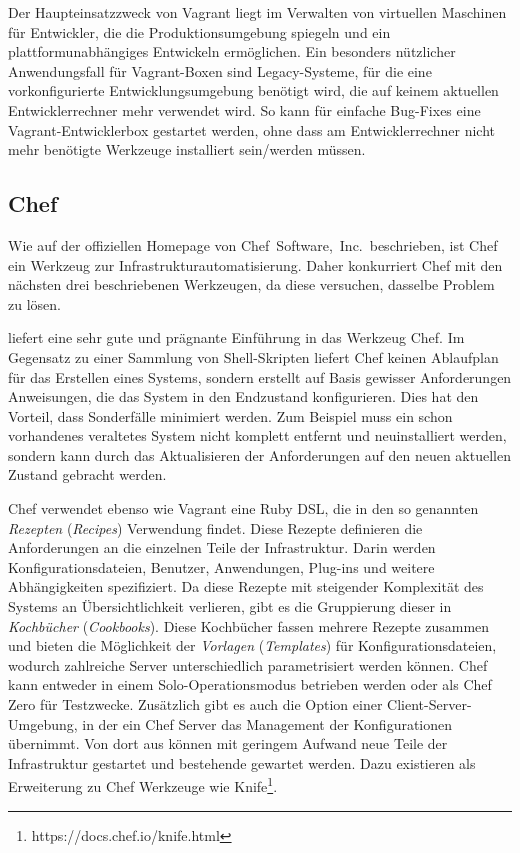 Der Haupteinsatzzweck von Vagrant liegt im Verwalten von virtuellen Maschinen für Entwickler, die die Produktionsumgebung spiegeln und ein plattformunabhängiges Entwickeln ermöglichen.
Ein besonders nützlicher Anwendungsfall für Vagrant-Boxen sind Legacy-Systeme, für die eine vorkonfigurierte Entwicklungsumgebung benötigt wird, die auf keinem aktuellen Entwicklerrechner mehr verwendet wird.
So kann für einfache Bug-Fixes eine Vagrant-Entwicklerbox gestartet werden, ohne dass am Entwicklerrechner nicht mehr benötigte Werkzeuge installiert sein/werden müssen.


\subsection{Chef}
\label{sub:chef}
Wie auf der offiziellen Homepage \autocite{Chef:online} von Chef~Software,~Inc.\ beschrieben, ist Chef ein Werkzeug zur Infrastrukturautomatisierung. Daher konkurriert Chef mit den nächsten drei beschriebenen Werkzeugen, da diese versuchen, dasselbe Problem zu lösen.

\autocite[34\psqq]{Wolff201604} liefert eine sehr gute und prägnante Einführung in das Werkzeug Chef.
Im Gegensatz zu einer Sammlung von Shell-Skripten liefert Chef keinen Ablaufplan für das Erstellen eines Systems, sondern erstellt auf Basis gewisser Anforderungen Anweisungen, die das System in den Endzustand konfigurieren.
Dies hat den Vorteil, dass Sonderfälle minimiert werden. Zum Beispiel muss ein schon vorhandenes veraltetes System nicht komplett entfernt und neuinstalliert werden, sondern kann durch das Aktualisieren der Anforderungen auf den neuen aktuellen Zustand gebracht werden.

Chef verwendet ebenso wie Vagrant eine Ruby DSL, die in den so genannten \emph{Rezepten} (\emph{Recipes}) Verwendung findet.
Diese Rezepte definieren die Anforderungen an die einzelnen Teile der Infrastruktur. Darin werden Konfigurationsdateien, Benutzer, Anwendungen, Plug-ins und weitere Abhängigkeiten spezifiziert.
Da diese Rezepte mit steigender Komplexität des Systems an Übersichtlichkeit verlieren, gibt es die Gruppierung dieser in \emph{Kochbücher} (\emph{Cookbooks}).
Diese Kochbücher fassen mehrere Rezepte zusammen und bieten die Möglichkeit der \emph{Vorlagen} (\emph{Templates}) für Konfigurationsdateien, wodurch zahlreiche Server unterschiedlich parametrisiert werden können.
Chef kann entweder in einem Solo-Operationsmodus betrieben werden oder als Chef Zero für Testzwecke. Zusätzlich gibt es auch die Option einer Client-Server-Umgebung, in der ein Chef Server das Management der Konfigurationen übernimmt.
Von dort aus können mit geringem Aufwand neue Teile der Infrastruktur gestartet und bestehende gewartet werden. Dazu existieren als Erweiterung zu Chef Werkzeuge wie Knife\footnote{https://docs.chef.io/knife.html}.

